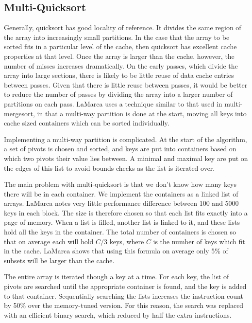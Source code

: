 \documentclass[acmtocl]{acmtrans2m}
\begin{document}
\subsection{Multi-Quicksort}
Generally, quicksort has good locality of reference. It divides the
same region of the array into increasingly small partitions.  In the
case that the array to be sorted fits in a particular level of the
cache, then quicksort has excellent cache properties at that
level. Once the array is larger than the cache, however, the number of
misses increases dramatically. On the early passes, which divide the
array into large sections, there is likely to be little reuse of data
cache entries between passes. Given that there is little reuse between
passes, it would be better to reduce the number of passes by dividing
the array into a larger number of partitions on each pass. LaMarca
uses a technique similar to that used in multi-mergesort, in that a
multi-way partition is done at the start, moving all keys into
cache sized containers which can be sorted individually.

Implementing a multi-way partition is complicated. At the start of the
algorithm, a set of pivots is chosen and sorted, and keys are put into
containers based on which two pivots their value lies between. A
minimal and maximal key are put on the edges of this list to avoid
bounds checks as the list is iterated over.

The main problem with multi-quicksort is that we don't know how many
keys there will be in each container. We implement the containers as a
linked list of arrays. LaMarca notes very little performance
difference between 100 and 5000 keys in each block. The size is
therefore chosen so that each list fits exactly into a page of
memory. When a list is filled, another list is linked to it, and these
lists hold all the keys in the container. The total number of
containers is chosen so that on average each will hold $C/3$ keys,
where $C$ is the number of keys which fit in the cache. LaMarca shows
that using this formula on average only 5\% of subsets will be larger
than the cache.

The entire array is iterated though a key at a time. For each key, the
list of pivots are searched until the appropriate container is found,
and the key is added to that container. Sequentially searching the
lists increases the instruction count by 50\% over the memory-tuned
version. For this reason, the search was replaced with an efficient
binary search, which reduced by half the extra instructions.
\end{document}
